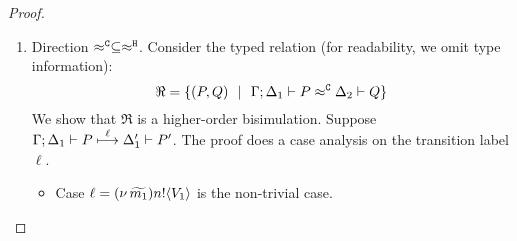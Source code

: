 \begin{proof}
\begin{enumerate}
\begin{itemize}
\begin{eqnarray}
\begin{array}{crll}
									\Hby{} & \Delta_4' & \proves & Q''
								\end{array}
								\label{lem:wb_eq_wbf_5}
							\end{eqnarray}
							and
								\[
									\horel{\Gamma}
									{\Delta_3'}{\newsp{\widetilde{m_1}}{P' \Par \newsp{s}{\map{\btinp{U} \tinact}^{s} \Par \bout{\dual{s}}{V_1} \inact}}}
									{\hwb}
									{\Delta_4'}{Q''}
								\]
							which implies from the definition of $\Re$:
							\begin{eqnarray}
								\horel{\Gamma}
								{\Delta_3'}{\newsp{\widetilde{m_1}}{P' \Par \newsp{s}{\map{\btinp{U} \tinact}^{s} \Par \bout{\dual{s}}{V_1} \inact}}}
								{\ \Re\ }
								{\Delta_4'}{Q''}
								\label{lem:wb_eq_wbf6}
							\end{eqnarray}
							From the pair in \eqref{lem:wb_eq_wbf4}, we get:
							\[
								\mhorel{\Gamma}{\Delta_3}{\newsp{\widetilde{m_1}}{P' \Par \fotrigger{t}{x}{s}{\btinp{U} \tinact}{V_1}}}
								{\hby{\bactinp{t}{m'}}}
								{\Delta_3'}{}{\newsp{\widetilde{m_1}}{P' \Par \newsp{s}{\map{\btinp{U} \tinact}^{s} \Par \bout{\dual{s}}{V_1} \inact}}}
							\]
							The freshness of $t$ allows us to mimic the transitions
							in \eqref{lem:wb_eq_wbf_5} to get:
							\[
								\begin{array}{crll}
									& \Gamma; \es; \Delta_4 & \proves &		
									\newsp{\widetilde{m_2}}{Q' \Par \fotrigger{t}{x}{s}{\btinp{U} \tinact}{V_2}}
									\\
									\Hby{} &&&
									\newsp{\widetilde{m_2}}{Q_2 \Par \fotrigger{t}{x}{s}{\btinp{U} \tinact}{V_2}}
									\\
									\hby{\bactinp{t}{m'}}& & &
									\newsp{\widetilde{m_2}}{Q_2 \Par \newsp{s}{\map{\btinp{U} \tinact}^{s} \Par \bout{\dual{s}}{V_2} \inact}}
									\\
									\Hby{} & \Delta_4' & \proves & Q''
								\end{array}
							\]
						This last implication together with the result in \eqref{lem:wb_eq_wbf6}
						concludes the proof of the case.

					\item	The other cases are trivial.
				\end{itemize}

		\item	Direction $\approx^\mathtt{C} \subseteq \approx^\mathtt{H}$.
				\noi Consider the typed relation (for readability, we omit type information):
				\[
					\Re = \{
								(P, Q) 
								\ \ |\ \ 
								\Gamma; \Delta_1 \vdash P \approx^\mathtt{C} \Delta_2 \vdash Q\}
				\]
				We show that $\Re$ is a higher-order bisimulation.
				Suppose
				$
						\Gamma; \Delta_1 \vdash P \stackrel{ \ell}{\longmapsto} \Delta_1' \vdash P'
				$.
				The proof does a case analysis on the transition label $\ell$.
				\begin{itemize}
					\item	Case $\ell = (\nu\, \widetilde{m_1}) n ! \langle V_1 \rangle$ is the non-trivial case.


\end{itemize}
\end{enumerate}
\end{proof}
